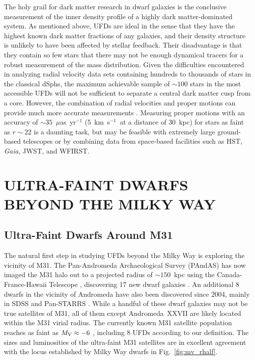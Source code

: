 \documentclass[a4paper]{ar-1col}
\newcommand{\kms}         {km~s$^{-1}$}
\begin{document}
The holy grail for dark matter research in dwarf galaxies is the
conclusive measurement of the inner density profile of a highly dark
matter-dominated system.  As mentioned above, UFDs are ideal in the
sense that they have the highest known dark matter fractions of any
galaxies, and their density structure is unlikely to have been
affected by stellar feedback.  Their disadvantage is that they contain
so few stars that there may not be enough dynamical tracers for a
robust measurement of the mass distribution.  Given the difficulties
encountered in analyzing radial velocity data sets containing hundreds
to thousands of stars in the classical dSphs, the maximum achievable
sample of $\sim100$ stars in the most accessible UFDs will not be
sufficient to separate a central dark matter cusp from a core.
However, the combination of radial velocities and proper motions can
provide much more accurate measurements
\citep[e.g.,][]{strigari07,kallivayalil15}.  Measuring proper motions
with an accuracy of $\sim35$~$\mu$as~yr$^{-1}$ (5~\kms\ at a distance
of 30~kpc) for stars as faint as $r \sim 22$ is a daunting task, but
may be feasible with extremely large ground-based telescopes or by
combining data from space-based facilities such as HST, \emph{Gaia},
JWST, and WFIRST.



\section{ULTRA-FAINT DWARFS BEYOND THE MILKY WAY}
\label{sec:beyond_mw}

\subsection{Ultra-Faint Dwarfs Around M31}

The natural first step in studying UFDs beyond the Milky Way is
exploring the vicinity of M31.  The Pan-Andromeda Archaeological
Survey (PAndAS) has now imaged the M31 halo out to a projected radius
of $\sim150$~kpc using the Canada-France-Hawaii Telescope
\citep{mcconnachie09}, discovering 17 new dwarf galaxies
\citep{martin06,martin09,martin16c,ibata07,irwin08,mcconnachie08,richardson11}.
An additional 8 dwarfs in the vicinity of Andromeda have also been
discovered since 2004, mainly in SDSS and Pan-STARRS
\citep{zucker04,zucker07,majewski07,slater11,bell11,martin13b,martin13c}.
While a handful of these dwarf galaxies may not be true satellites of
M31, all of them except Andromeda~XXVII \citep{conn12} are likely
located within the M31 virial radius.  The currently known M31
satellite population reaches as faint as $M_{{\rm V}} \approx -6$
\citep{martin16c}, including 8 UFDs according to our definition.  The
sizes and luminosities of the ultra-faint M31 satellites are in
excellent agreement with the locus established by Milky Way dwarfs in
Fig.~\ref{fig:mv_rhalf}.
\end{document}
